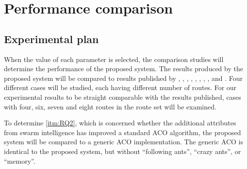 \section{Performance comparison}
\label{sec:performanceComparison}
\subsection{Experimental plan}
When the value of each parameter is selected, the comparison studies will determine the performance of the proposed system. The results produced by the proposed system will be compared to results published by \citet{mandl79}, \citet{kechagiopoulos14}, \citet{nikolic14}, \citet{kidwai98}, \citet{fan10}, \citet{chakroborty02}, \citet{zhang10}, \citet{chew12}, and \citet{baaj91}. Four different cases will be studied, each having different number of routes. For our experimental results to be straight comparable with the results published, cases with four, six, seven and eight routes in the route set will be examined.

To determine \vref{itm:RQ2}, which is concerned whether the additional attributes from swarm intelligence has improved a standard ACO algorithm, the proposed system will be compared to a generic ACO implementation. The generic ACO is identical to the proposed system, but without ``following ants'', ``crazy ants'', or ``memory''. 

